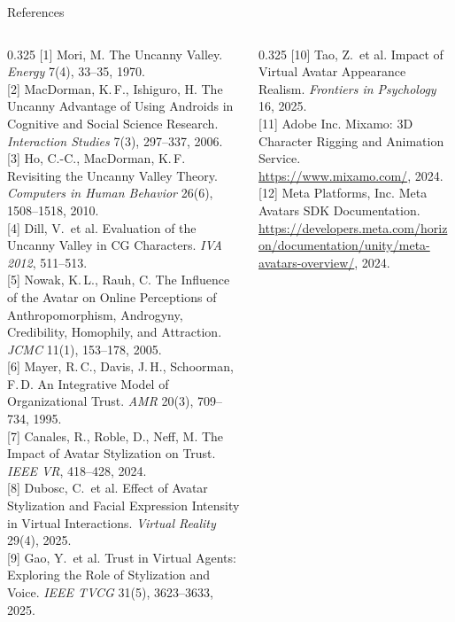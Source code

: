 \documentclass[aspectratio=169,10pt]{beamer}
\begin{document}
\begin{frame}{References}
  \vspace{0.2em}
  \tiny
  \begin{columns}[T]
    \begin{column}{0.325\textwidth}
      [1] Mori, M. The Uncanny Valley. \textit{Energy} 7(4), 33--35, 1970.\\[0.3em]
      [2] MacDorman, K.\,F., Ishiguro, H. The Uncanny Advantage of Using Androids in Cognitive and Social Science Research. \textit{Interaction Studies} 7(3), 297--337, 2006.\\[0.3em]
      [3] Ho, C.-C., MacDorman, K.\,F. Revisiting the Uncanny Valley Theory. \textit{Computers in Human Behavior} 26(6), 1508--1518, 2010.\\[0.3em]
      [4] Dill, V.\ et al. Evaluation of the Uncanny Valley in CG Characters. \textit{IVA 2012}, 511--513.\\[0.3em]
      [5] Nowak, K.\,L., Rauh, C. The Influence of the Avatar on Online Perceptions of Anthropomorphism, Androgyny, Credibility, Homophily, and Attraction. \textit{JCMC} 11(1), 153--178, 2005.\\[0.3em]
      [6] Mayer, R.\,C., Davis, J.\,H., Schoorman, F.\,D. An Integrative Model of Organizational Trust. \textit{AMR} 20(3), 709--734, 1995.\\[0.3em]
      [7] Canales, R., Roble, D., Neff, M. The Impact of Avatar Stylization on Trust. \textit{IEEE VR}, 418--428, 2024.\\[0.3em]
      [8] Dubosc, C.\ et al. Effect of Avatar Stylization and Facial Expression Intensity in Virtual Interactions. \textit{Virtual Reality} 29(4), 2025.\\[0.3em]
      [9] Gao, Y.\ et al. Trust in Virtual Agents: Exploring the Role of Stylization and Voice. \textit{IEEE TVCG} 31(5), 3623--3633, 2025.\\[0.3em]
    \end{column}
    \begin{column}{0.325\textwidth}
      [10] Tao, Z.\ et al. Impact of Virtual Avatar Appearance Realism. \textit{Frontiers in Psychology} 16, 2025.\\[0.3em]
      [11] Adobe Inc. Mixamo: 3D Character Rigging and Animation Service. \url{https://www.mixamo.com/}, 2024.\\[0.3em]
      [12] Meta Platforms, Inc. Meta Avatars SDK Documentation. \url{https://developers.meta.com/horizon/documentation/unity/meta-avatars-overview/}, 2024.\\[0.3em]

\end{column}
\end{columns}
\end{frame}
\end{document}

